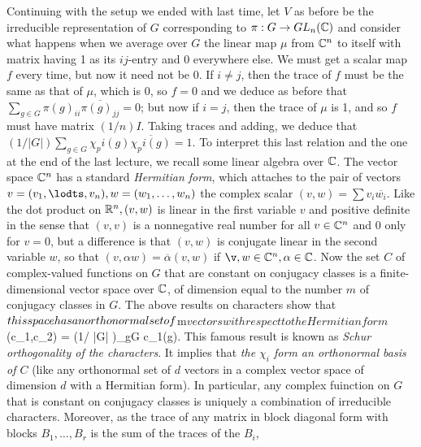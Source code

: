 Continuing with the setup we ended with last time, let $V$ as before be the irreducible representation of $G$ corresponding to $\pi:G\rightarrow GL_n(\Bbb C)$ and consider what happens when we average over $G$ the linear map $\mu$ from $\Bbb C^n$ to itself with matrix having 1 as its $ij$-entry and 0 everywhere else.  We must get a scalar map $f$ every time, but now it need not be 0.  If
$i\ne j$, then the trace of $f$ must be the same as that of $\mu$, which is 0, so $f=0$ and we deduce as before that $\sum_{g\in G} \pi(g)_{ii} \overline{\pi(g)_{jj}} = 0$; but now if $i=j$, then the trace of
$\mu$ is 1, and so $f$ must have matrix $(1/n)I$.  Taking traces and adding, we deduce that
$(1/ | G |)\sum_{g\in G} \chi_pi(g)\overline{\chi_pi(g)} = 1$.  To interpret this last relation and the one at the end of the last lecture, we recall some linear algebra over $\Bbb C$.  The vector space $\Bbb C^n$ has a standard {\sl Hermitian form}, which attaches to the pair of vectors
$v = (v_1,\lodts,v_n), w = (w_1,\ldots,w_n)$ the complex scalar $(v,w) = \sum v_i\overline{w_i}$.  Like the dot product on $\Bbb R^n, (v,w)$ is linear in the first variable $v$ and positive definite in the sense that $(v,v)$ is a nonnegative real number for all $v\in\Bbb C^n$ and 0 only for $v=0$, but a difference is that $(v,w)$ is conjugate linear in the second variable $w$, so that
$(v,\alpha w) = \overline{\alpha}(v,w)$ if $\v,w\in\Bbb C^n,\alpha\in\Bbb C$.  Now the set $C$ of complex-valued functions on $G$ that are constant on conjugacy classes is a finite-dimensional vector space over $\Bbb C$, of dimension equal to the number $m$ of conjugacy classes in $G$.  The above results on characters show that $\sl this space has an orthonormal set of $m$ vectors with respect to the Hermitian form $(c_1,c_2) = (1/ |G| )\sum_{g\in G} c_1(g).  This famous result is known as {\sl Schur orthogonality of the characters}.  It implies that {\sl the $\chi_i$ form an orthonormal basis of $C$} (like any orthonormal set of $d$ vectors in a complex vector space of dimension $d$ with a Hermitian form).  In particular, any complex fuinction on $G$ that is constant on conjugacy classes is uniquely a combination of irreducible characters.  Moreover, as the trace of any matrix in block diagonal form with blocks $B_1,\ldots,B_r$ is the sum of the traces of the $B_i$,
